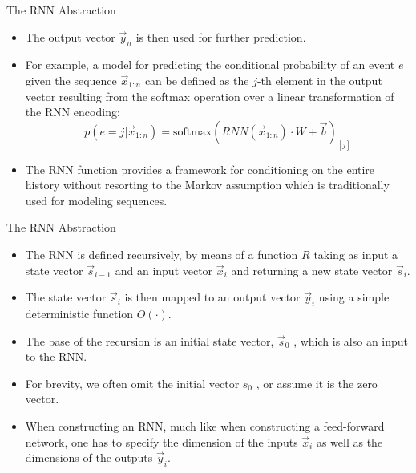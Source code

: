\documentclass[handout]{beamer}
\begin{document}
\begin{frame}{The RNN Abstraction}
\begin{scriptsize}
\begin{itemize}

\item The output vector $\vec{y}_n$ is then used for further prediction.
\item For example, a model for predicting the conditional probability of an event $e$ given the sequence $\vec{x}_{1:n}$ can be defined as the $j$-th element in the output vector resulting from the softmax operation over a linear transformation of the RNN encoding:
\begin{displaymath}
p(e = j|\vec{x}_{1:n}) = \text{softmax}(RNN(\vec{x}_{1:n})\cdot W +\vec{b})_{[j]} 
\end{displaymath}
\item The RNN function provides a framework for conditioning on the entire history without resorting to the Markov assumption which is traditionally used for modeling sequences.
\end{itemize}
\end{scriptsize}
\end{frame}



\begin{frame}{The RNN Abstraction}
\begin{scriptsize}
\begin{itemize}
\item The RNN is defined recursively, by means of a function $R$ taking as input a state vector $\vec{s}_{i-1}$  and an input vector $\vec{x}_{i}$ and returning a new state vector $\vec{s}_i$. 
\item The state vector $\vec{s}_i$ is then mapped to an output vector $\vec{y}_i$ using a simple deterministic function $O(\cdot)$.
\item The base of the recursion is an initial state vector, $\vec{s}_{0}$ , which is also an input to the RNN.
\item For brevity, we often omit the initial vector $s_{0}$ , or assume it is the zero vector.
\item When constructing an RNN, much like when constructing a feed-forward network, one has to specify the dimension of the inputs $\vec{x}_i$ as well as the dimensions of the outputs $\vec{y}_i$. 
\end{itemize}
\end{scriptsize}
\end{frame}
\end{document}
